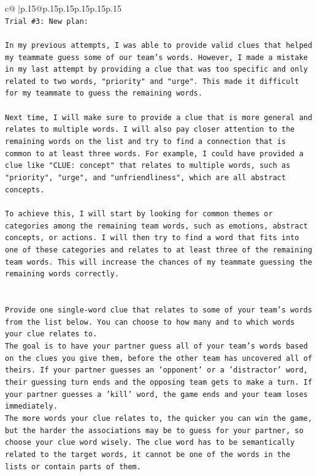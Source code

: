 \documentclass{article}
\begin{document}
{\begin{supertabular}{c@{$\;$}|p{.15\linewidth}@{}p{.15\linewidth}p{.15\linewidth}p{.15\linewidth}p{.15\linewidth}p{.15\linewidth}}
{{{\\ 
\texttt{Trial \#3: New plan: } \\
\\ 
\texttt{In my previous attempts, I was able to provide valid clues that helped my teammate guess some of our team's words. However, I made a mistake in my last attempt by providing a clue that was too specific and only related to two words, "priority" and "urge". This made it difficult for my teammate to guess the remaining words.} \\
\\ 
\texttt{Next time, I will make sure to provide a clue that is more general and relates to multiple words. I will also pay closer attention to the remaining words on the list and try to find a connection that is common to at least three words. For example, I could have provided a clue like "CLUE: concept" that relates to multiple words, such as "priority", "urge", and "unfriendliness", which are all abstract concepts.} \\
\\ 
\texttt{To achieve this, I will start by looking for common themes or categories among the remaining team words, such as emotions, abstract concepts, or actions. I will then try to find a word that fits into one of these categories and relates to at least three of the remaining team words. This will increase the chances of my teammate guessing the remaining words correctly.} \\
\\ 
\\ 
\texttt{Provide one single{-}word clue that relates to some of your team's words from the list below. You can choose to how many and to which words your clue relates to.} \\
\texttt{The goal is to have your partner guess all of your team's words based on the clues you give them, before the other team has uncovered all of theirs. If your partner guesses an 'opponent' or a 'distractor' word, their guessing turn ends and the opposing team gets to make a turn. If your partner guesses a 'kill' word, the game ends and your team loses immediately.} \\
\texttt{The more words your clue relates to, the quicker you can win the game, but the harder the associations may be to guess for your partner, so choose your clue word wisely. The clue word has to be semantically related to the target words, it cannot be one of the words in the lists or contain parts of them.} \\
\\ 
}}}
\end{supertabular}}
\end{document}
